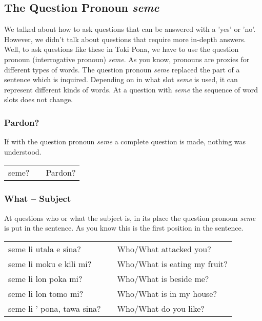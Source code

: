 \subsection*{The Question Pronoun \textit{seme}}
%
We talked about how to ask questions that can be answered with a 'yes' or 'no'. 
However, we didn't talk about questions that require more in-depth answers. 
Well, to ask questions like these in Toki Pona, we have to use the question pronoun (interrogative pronoun) \textit{seme}. 
As you know, pronouns are proxies for different types of words.
The question pronoun \textit{seme} replaced the part of a sentence which is inquired.
Depending on in what slot \textit{seme} is used, it can represent different kinds of words. 
At a question with \textit{seme} the sequence of word slots does not change. 
%
\subsubsection*{Pardon?}
%
If with the question pronoun \textit{seme} a complete question is made, nothing was understood. 

\begin{supertabular}{p{5,5cm}|ll}
seme? && Pardon? \\
\end{supertabular} 
%
\subsubsection*{What -- Subject}
%
At questions who or what the subject is, in its place the question pronoun \textit{seme} is put in the sentence.
As you know this is the first position in the sentence. 

\begin{supertabular}{p{5,5cm}|ll}
seme li utala e sina? && Who/What attacked you? \\
seme li moku e kili mi? && Who/What is eating my fruit? \\
seme li lon poka mi? && Who/What is beside me? \\
seme li lon tomo mi? && Who/What is in my house? \\
seme li ' pona, tawa sina? && Who/What do you like? \\ 
\end{supertabular} 
%

